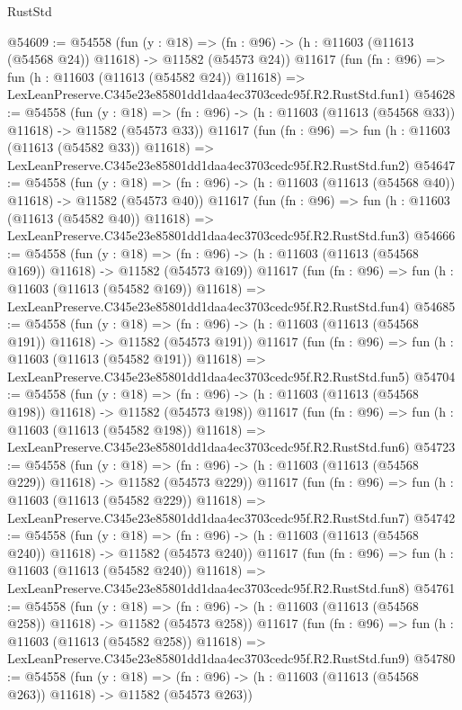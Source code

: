 \begin{lexlean}{RustStd}
\begin{coremodule}
@54609 := @54558
    (fun (y : @18) =>
    (fn : @96) -> (h : @11603 (@11613 (@54568 @24)) @11618) -> @11582 (@54573 @24))
    @11617
    (fun (fn : @96) =>
    fun (h : @11603 (@11613 (@54582 @24)) @11618) =>
    LexLeanPreserve.C345e23e85801dd1daa4ec3703cedc95f.R2.RustStd.fun1)
@54628 := @54558
    (fun (y : @18) =>
    (fn : @96) -> (h : @11603 (@11613 (@54568 @33)) @11618) -> @11582 (@54573 @33))
    @11617
    (fun (fn : @96) =>
    fun (h : @11603 (@11613 (@54582 @33)) @11618) =>
    LexLeanPreserve.C345e23e85801dd1daa4ec3703cedc95f.R2.RustStd.fun2)
@54647 := @54558
    (fun (y : @18) =>
    (fn : @96) -> (h : @11603 (@11613 (@54568 @40)) @11618) -> @11582 (@54573 @40))
    @11617
    (fun (fn : @96) =>
    fun (h : @11603 (@11613 (@54582 @40)) @11618) =>
    LexLeanPreserve.C345e23e85801dd1daa4ec3703cedc95f.R2.RustStd.fun3)
@54666 := @54558
    (fun (y : @18) =>
    (fn : @96) -> (h : @11603 (@11613 (@54568 @169)) @11618) -> @11582 (@54573 @169))
    @11617
    (fun (fn : @96) =>
    fun (h : @11603 (@11613 (@54582 @169)) @11618) =>
    LexLeanPreserve.C345e23e85801dd1daa4ec3703cedc95f.R2.RustStd.fun4)
@54685 := @54558
    (fun (y : @18) =>
    (fn : @96) -> (h : @11603 (@11613 (@54568 @191)) @11618) -> @11582 (@54573 @191))
    @11617
    (fun (fn : @96) =>
    fun (h : @11603 (@11613 (@54582 @191)) @11618) =>
    LexLeanPreserve.C345e23e85801dd1daa4ec3703cedc95f.R2.RustStd.fun5)
@54704 := @54558
    (fun (y : @18) =>
    (fn : @96) -> (h : @11603 (@11613 (@54568 @198)) @11618) -> @11582 (@54573 @198))
    @11617
    (fun (fn : @96) =>
    fun (h : @11603 (@11613 (@54582 @198)) @11618) =>
    LexLeanPreserve.C345e23e85801dd1daa4ec3703cedc95f.R2.RustStd.fun6)
@54723 := @54558
    (fun (y : @18) =>
    (fn : @96) -> (h : @11603 (@11613 (@54568 @229)) @11618) -> @11582 (@54573 @229))
    @11617
    (fun (fn : @96) =>
    fun (h : @11603 (@11613 (@54582 @229)) @11618) =>
    LexLeanPreserve.C345e23e85801dd1daa4ec3703cedc95f.R2.RustStd.fun7)
@54742 := @54558
    (fun (y : @18) =>
    (fn : @96) -> (h : @11603 (@11613 (@54568 @240)) @11618) -> @11582 (@54573 @240))
    @11617
    (fun (fn : @96) =>
    fun (h : @11603 (@11613 (@54582 @240)) @11618) =>
    LexLeanPreserve.C345e23e85801dd1daa4ec3703cedc95f.R2.RustStd.fun8)
@54761 := @54558
    (fun (y : @18) =>
    (fn : @96) -> (h : @11603 (@11613 (@54568 @258)) @11618) -> @11582 (@54573 @258))
    @11617
    (fun (fn : @96) =>
    fun (h : @11603 (@11613 (@54582 @258)) @11618) =>
    LexLeanPreserve.C345e23e85801dd1daa4ec3703cedc95f.R2.RustStd.fun9)
@54780 := @54558
    (fun (y : @18) =>
    (fn : @96) -> (h : @11603 (@11613 (@54568 @263)) @11618) -> @11582 (@54573 @263))

\end{coremodule}
\end{lexlean}
